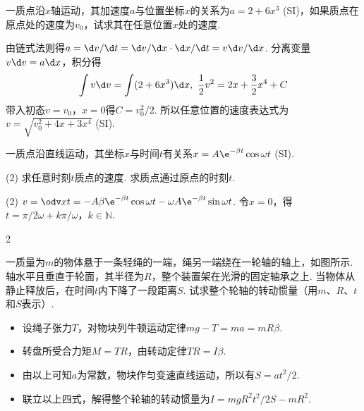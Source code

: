 \begin{problem}
一质点沿$x$轴运动，其加速度$a$与位置坐标$x$的关系为$a=2+6x^3$ (SI)，如果质点在原点处的速度为$v_0$，试求其在任意位置$x$处的速度.
\end{problem}
\begin{solution}
    由链式法则得$a=\d v/\d t=\d v/\d x\cdot\d x/\d t=v\d v/\d x$. 分离变量$v\d v=a\d x$，积分得
    \[\int v\d v=\int(2+6x^3)\d x,\ \frac{1}{2}v^2=2x+\frac{3}{2}x^4+C\]
带入初态$v=v_0$，$x=0$得$C=v_0^2/2$. 所以任意位置的速度表达式为$v=\sqrt{v_0^2+4x+3x^4}$ (SI).
\end{solution}

\begin{problem}
    一质点沿直线运动，其坐标$x$与时间$t$有关系$x=A\e^{-\beta t}\cos\omega t$ (SI).
    \begin{tasks}[label=\arabic*.](2)
        \task 求任意时刻$t$质点的速度.
        \task 求质点通过原点的时刻$t$.
    \end{tasks}
\end{problem}
\begin{solution}\leavevmode
    \begin{tasks}[label=\arabic*.](2)
        \task $v=\odv xt=-A\beta\e^{-\beta t}\cos\omega t-\omega A\e^{-\beta t}\sin\omega t$.
        \task 令$x=0$，得$t=\pi/2\omega+k\pi/\omega$，$k\in\mathbb N$.
    \end{tasks}
\end{solution}

\begin{paracol}{2}
\begin{problem}
    一质量为$m$的物体悬于一条轻绳的一端，绳另一端绕在一轮轴的轴上，如图所示. 轴水平且垂直于轮面，其半径为$R$，整个装置架在光滑的固定轴承之上. 当物体从静止释放后，在时间$t$内下降了一段距离$S$. 试求整个轮轴的转动惯量（用$m$、$R$、$t$和$S$表示）.
    \switchcolumn\vspace*{\fill}\centering
    \vspace*{\fill}
\end{problem}    
\end{paracol}
\begin{solution}\leavevmode
    \begin{itemize}
        \item 设绳子张力$T$，对物块列牛顿运动定律$mg-T=ma=mR\beta$.
        \item 转盘所受合力矩$M=TR$，由转动定律$TR=I\beta$.
        \item 由以上可知$a$为常数，物块作匀变速直线运动，所以有$S=at^2/2$.
        \item 联立以上四式，解得整个轮轴的转动惯量为$I=mgR^2t^2/2S-mR^2$.
    \end{itemize}
\end{solution}

